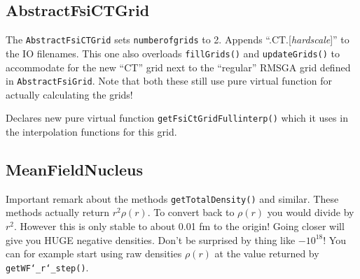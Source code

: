 \subsection{AbstractFsiCTGrid}
The \texttt{AbstractFsiCTGrid} sets \texttt{number\textunderscore of\textunderscore grids} to 2. Appends ``.CT.[\textit{hardscale}]'' to the IO filenames.
This one also overloads \texttt{fillGrids()} and \texttt{updateGrids()} to accommodate for the new ``CT'' grid next to the ``regular'' RMSGA grid defined in \texttt{AbstractFsiGrid}. Note that both these still use pure virtual function for actually calculating the grids!

Declares new pure virtual function \texttt{getFsiCtGridFull\textunderscore interp()} which it uses in the interpolation functions for this grid.

\subsection{MeanFieldNucleus}
Important remark about the methods \texttt{getTotalDensity()} and similar. These methods actually return $r^{2} \rho(r)$. To convert back to $\rho(r)$ you would divide by $r^{2}$. However this is only stable to about 0.01 fm to the origin! Going closer will give you \large{HUGE} negative densities. Don't be surprised by thing like $-10^{18}$! You can for example start using raw densities $\rho(r)$ at the value returned by \texttt{getWF\char`_r\char`_step()}.